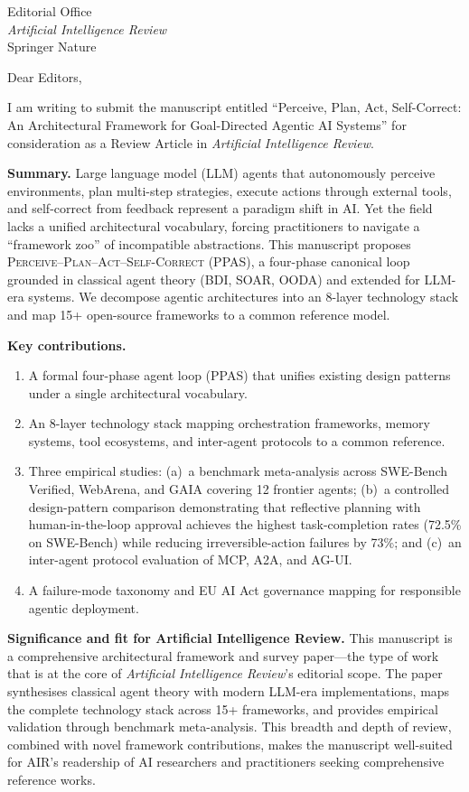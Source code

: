 \documentclass[11pt]{letter}
\date{April 7, 2026}
\begin{document}
\begin{letter}{%
Editorial Office\\
\emph{Artificial Intelligence Review}\\
Springer Nature}

\opening{Dear Editors,}

I am writing to submit the manuscript entitled ``Perceive, Plan, Act, Self-Correct: An Architectural Framework for Goal-Directed Agentic AI Systems'' for consideration as a Review Article in \emph{Artificial Intelligence Review}.

\textbf{Summary.}
Large language model (LLM) agents that autonomously perceive environments, plan multi-step strategies, execute actions through external tools, and self-correct from feedback represent a paradigm shift in AI. Yet the field lacks a unified architectural vocabulary, forcing practitioners to navigate a ``framework zoo'' of incompatible abstractions. This manuscript proposes \textsc{Perceive--Plan--Act--Self-Correct} (PPAS), a four-phase canonical loop grounded in classical agent theory (BDI, SOAR, OODA) and extended for LLM-era systems. We decompose agentic architectures into an 8-layer technology stack and map 15+ open-source frameworks to a common reference model.

\textbf{Key contributions.}
\begin{enumerate}
    \item A formal four-phase agent loop (PPAS) that unifies existing design patterns under a single architectural vocabulary.
    \item An 8-layer technology stack mapping orchestration frameworks, memory systems, tool ecosystems, and inter-agent protocols to a common reference.
    \item Three empirical studies: (a)~a benchmark meta-analysis across SWE-Bench Verified, WebArena, and GAIA covering 12 frontier agents; (b)~a controlled design-pattern comparison demonstrating that reflective planning with human-in-the-loop approval achieves the highest task-completion rates (72.5\% on SWE-Bench) while reducing irreversible-action failures by 73\%; and (c)~an inter-agent protocol evaluation of MCP, A2A, and AG-UI.
    \item A failure-mode taxonomy and EU AI Act governance mapping for responsible agentic deployment.
\end{enumerate}

\textbf{Significance and fit for Artificial Intelligence Review.}
This manuscript is a comprehensive architectural framework and survey paper---the type of work that is at the core of \emph{Artificial Intelligence Review}'s editorial scope. The paper synthesises classical agent theory with modern LLM-era implementations, maps the complete technology stack across 15+ frameworks, and provides empirical validation through benchmark meta-analysis. This breadth and depth of review, combined with novel framework contributions, makes the manuscript well-suited for AIR's readership of AI researchers and practitioners seeking comprehensive reference works.


\end{letter}
\end{document}
